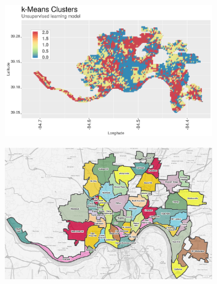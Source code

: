 \documentclass{llncs}
\begin{document}
\FloatBarrier
\begin{figure}
\caption{Cluster results on map of Cincinnati}
\label{figure:ClusterResults}
\begin{subfigure}[b]{0.5\textwidth}
\includegraphics[width = \textwidth, height = \textheight, keepaspectratio]{kmeansongrid.png}
\label{figure:kmeansongrid}
\end{subfigure}
%
\begin{subfigure}[b]{0.5\textwidth}
\includegraphics[width = \textwidth, height = \textheight, keepaspectratio]{cinci.png}
\label{figure:cinci}
\end{subfigure}
\end{figure}
\FloatBarrier
\end{document}
